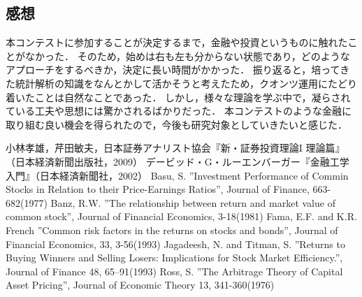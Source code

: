 ﻿\documentclass[11pt]{jreport}
\begin{document}
\begin{itemize}
\section{感想}

\quad 本コンテストに参加することが決定するまで，金融や投資というものに触れたことがなかった．
そのため，始めは右も左も分からない状態であり，どのようなアプローチをするべきか，決定に長い時間がかかった．
振り返ると，培ってきた統計解析の知識をなんとかして活かそうと考えたため，クオンツ運用にたどり着いたことは自然なことであった．
しかし，様々な理論を学ぶ中で，凝らされている工夫や思想には驚かされるばかりだった．
本コンテストのような金融に取り組む良い機会を得られたので，今後も研究対象としていきたいと感じた．

\end{itemize}


\begin{thebibliography}{30}
	 小林孝雄，芹田敏夫，日本証券アナリスト協会『新・証券投資理論I 理論篇』（日本経済新聞出版社，2009）
	 デービッド・G・ルーエンバーガー『金融工学入門』（日本経済新聞社，2002）
	 Basu, S. ''Investment Performance of Commin Stocks in Relation to their Price-Earnings Ratios'', Journal of Finance, 663-682(1977)
	 Banz, R.W. ''The relationship between return and market value of common stock'', Journal of Financial Economics, 3-18(1981)
	 Fama, E.F. and K.R. French ''Common risk factors in the returns on stocks and bonds'', Journal of Financial Economics, 33, 3-56(1993)
	 Jagadeesh, N. and Titman, S. ''Returns to Buying Winners and Selling Losers: Implications for Stock Market Efficiency.'', Journal of Finance 48, 65–91(1993)
	 Ross, S. ''The Arbitrage Theory of Capital Asset Pricing'', Journal of Economic Theory 13, 341-360(1976)
	
\end{thebibliography}
\end{document}
